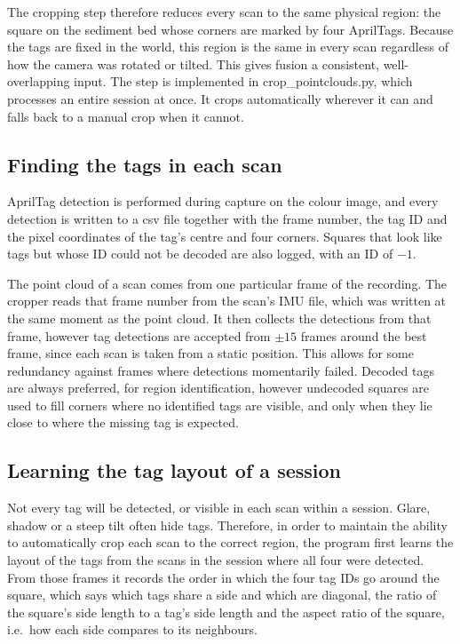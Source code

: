 The cropping step therefore reduces every scan to the same physical region: the square on the sediment bed whose corners are marked by four AprilTags. Because the tags are fixed in the world, this region is the same in every scan regardless of how the camera was rotated or tilted. This gives fusion a consistent, well-overlapping input. The step is implemented in crop\_pointclouds.py, which processes an entire session at once. It crops automatically wherever it can and falls back to a manual crop when it cannot.

\subsection{Finding the tags in each scan}

AprilTag detection is performed during capture on the colour image, and every detection is written to a csv file together with the frame number, the tag ID and the pixel coordinates of the tag's centre and four corners. Squares that look like tags but whose ID could not be decoded are also logged, with an ID of $-1$.

The point cloud of a scan comes from one particular frame of the recording. The cropper reads that frame number from the scan's IMU file, which was written at the same moment as the point cloud. It then collects the detections from that frame, however tag detections are accepted from $\pm 15$ frames around the best frame, since each scan is taken from a static position. This allows for some redundancy against frames where detections momentarily failed. Decoded tags are always preferred, for region identification, however undecoded squares are used to fill corners where no identified tags are visible, and only when they lie close to where the missing tag is expected.

\subsection{Learning the tag layout of a session}

Not every tag will be detected, or visible in each scan within a session. Glare, shadow or a steep tilt often hide tags. Therefore, in order to maintain the ability to automatically crop each scan to the correct region, the program first learns the layout of the tags from the scans in the session where all four were detected. From those frames it records the order in which the four tag IDs go around the square, which says which tags share a side and which are diagonal, the ratio of the square's side length to a tag's side length and the aspect ratio of the square, i.e.\ how each side compares to its neighbours.


